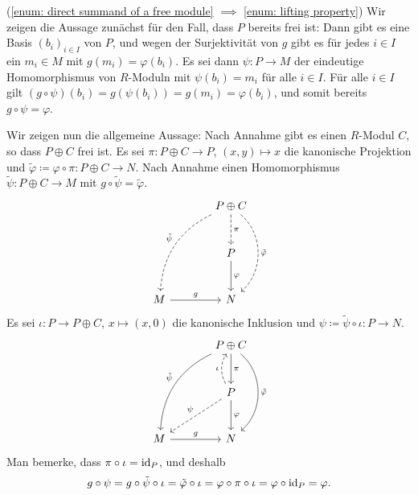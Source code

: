 \begin{solution}
  (\ref{enum: direct summand of a free module} $\implies$ \ref{enum: lifting property})
  Wir zeigen die Aussage zunächst für den Fall, dass $P$ bereits frei ist:
  Dann gibt es eine Basis $(b_i)_{i \in I}$ von $P$, und wegen der Surjektivität von $g$ gibt es für jedes $i \in I$ ein $m_i \in M$ mit $g(m_i) = \varphi(b_i)$.
  Es sei dann $\psi \colon P \to M$ der eindeutige Homomorphismus von $R$-Moduln mit $\psi(b_i) = m_i$ für alle $i \in I$.
  Für alle $i \in I$ gilt $(g \circ \psi)(b_i) = g(\psi(b_i)) = g(m_i) = \varphi(b_i)$, und somit bereits $g \circ \psi = \varphi$.
  
  Wir zeigen nun die allgemeine Aussage:
  Nach Annahme gibt es einen $R$-Modul $C$, so dass $P \oplus C$ frei ist.
  Es sei $\pi \colon P \oplus C \to P$, $(x,y) \mapsto x$ die kanonische Projektion und $\tilde{\varphi} \coloneqq \varphi \circ \pi \colon P \oplus C \to N$.
  Nach Annahme einen Homomorphismus $\tilde{\psi} \colon P \oplus C \to M$ mit $g \circ \tilde{\psi} = \tilde{\varphi}$.
  \[
    \begin{tikzcd}[row sep = large, column sep = large, ampersand replacement = \&]
          {}
      \&  P \oplus C
          \arrow[dashed]{d}{\pi}
          \arrow[dashed, bend left = 50]{dd}{\tilde{\varphi}}
          \arrow[dashed, bend right, swap]{ldd}{\tilde{\psi}}
      \\
          {}
      \&  P
          \arrow{d}{\varphi}
      \\
          M
          \arrow{r}{g}
      \&  N
    \end{tikzcd}
  \]
  Es sei $\iota \colon P \to P \oplus C$, $x \mapsto (x,0)$ die kanonische Inklusion und $\psi \coloneqq \tilde{\psi} \circ \iota \colon P \to N$.
  \[
    \begin{tikzcd}[row sep = large, column sep = large, ampersand replacement = \&]
          {}
      \&  P \oplus C
          \arrow{d}{\pi}
          \arrow[bend left = 50]{dd}{\tilde{\varphi}}
          \arrow[bend right, swap]{ldd}{\tilde{\psi}}
      \\
          {}
      \&  P
          \arrow[dashed, bend left]{u}{\iota}
          \arrow{d}{\varphi}
          \arrow[dashed, swap]{dl}{\psi}
      \\
          M
          \arrow{r}{g}
      \&  N
    \end{tikzcd}
  \]
  Man bemerke, dass $\pi \circ \iota = \operatorname{id}_P$, und deshalb
  \[
      g \circ \psi
    = g \circ \tilde{\psi} \circ \iota
    = \tilde{\varphi} \circ \iota
    = \varphi \circ \pi \circ \iota
    = \varphi \circ \operatorname{id}_P
    = \varphi.
  \]
\end{solution}


